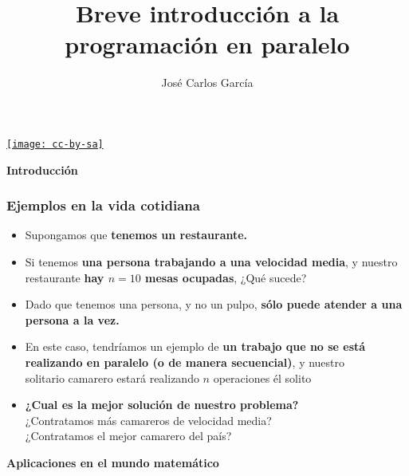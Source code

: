 \documentclass[aspectratio=169]{beamer}
\title{\color{azulUCA}\textbf{Breve introducción a la programación en paralelo}}
\subtitle{\color{azulUCA} José Carlos García}
\date{}
\begin{document}
\begin{frame}
	\titlepage
	\begin{center}
		\href{http://creativecommons.org/licenses/by-sa/3.0/es/}{\texttt{[image: cc-by-sa]}}
	\end{center}
\end{frame}

\begin{frame}
	\centering \LARGE \bfseries \color{naranjaUCA} Introducción
\end{frame}


\begin{frame}
	\frametitle{Ejemplos en la vida cotidiana}
	\begin{itemize}
		\item Supongamos que \textbf{tenemos un restaurante.}
		\pause
		\item Si tenemos \textbf{una persona trabajando a una velocidad media}, y nuestro restaurante \textbf{hay $n=10$ mesas ocupadas}, ¿Qué sucede?
		\pause
		\item Dado que tenemos una persona, y no un pulpo, \textbf{sólo puede atender a una persona a la vez.}
		\pause
		\item En este caso, tendríamos un ejemplo de \textbf{un trabajo que no se está \\realizando en paralelo (o de manera secuencial)}, y nuestro \\solitario camarero estará realizando $n$ operaciones él solito
		\pause
		\item \textbf{¿Cual es la mejor solución de nuestro problema?} \\¿Contratamos más camareros de velocidad media? \\¿Contratamos el mejor camarero del país?
	\end{itemize}
\end{frame}

\begin{frame}
		\centering \LARGE \bfseries \color{naranjaUCA} Aplicaciones en el mundo matemático
\end{frame}
\end{document}
